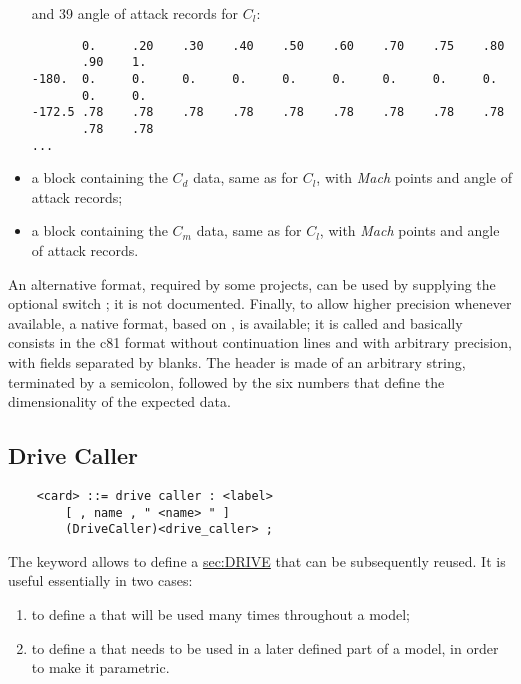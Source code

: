 \begin{itemize}
and 39 angle of attack records for $C_l$:
{\small
\begin{verbatim}
       0.     .20    .30    .40    .50    .60    .70    .75    .80
       .90    1.
-180.  0.     0.     0.     0.     0.     0.     0.     0.     0.
       0.     0.
-172.5 .78    .78    .78    .78    .78    .78    .78    .78    .78
       .78    .78
...
\end{verbatim}
}
\item a block containing the $C_d$ data, same as for $C_l$,
with  \emph{Mach} points and  angle of attack records;
\item a block containing the $C_m$ data, same as for $C_l$,
with  \emph{Mach} points and  angle of attack records.
\end{itemize}
An alternative format, required by some projects, can be used by supplying
the optional switch ; it is not documented.
Finally, to allow higher precision whenever available, a native format,
based on , is available; it is called  and 
basically consists in the c81 format without continuation lines
and with arbitrary precision, with fields separated by blanks.
The header is made of an arbitrary string, terminated by a semicolon,
followed by the six numbers that define the dimensionality of the expected data.


\subsection{Drive Caller}\label{sec:DRIVE-CALLER}
\begin{verbatim}
    <card> ::= drive caller : <label>
        [ , name , " <name> " ]
        (DriveCaller)<drive_caller> ;
\end{verbatim}
The keyword  allows to define
a \hyperref{\kw{drive caller}}{\kw{drive caller} (see Section~}{)}{sec:DRIVE}
that can be subsequently reused.
It is useful essentially in two cases:
\begin{enumerate}
	\renewcommand{\labelenumi}{\alph{enumi})}
	\item to define a 
	that will be used many times throughout a model;
	\item to define a  
	that needs to be used in a later defined part of a model, 
	in order to make it parametric.
\end{enumerate}



